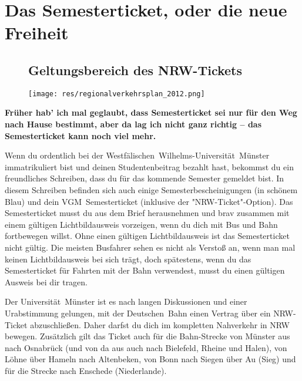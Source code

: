 \section{Das Semesterticket, oder die neue Freiheit}

\begin{center}
\end{center}
\begin{multicols}{2}
\begin{figure*}[t]
\subsection*{Geltungsbereich des NRW-Tickets}
\texttt{[image: res/regionalverkehrsplan\_2012.png]}
\end{figure*}
\textbf{Früher hab' ich mal geglaubt, dass Semesterticket sei nur für den Weg nach Hause bestimmt, aber da lag ich nicht ganz richtig -- das Semesterticket kann noch viel mehr.}


Wenn du ordentlich bei der Westfälischen~Wilhelms-Universität~Münster immatrikuliert bist und deinen Studentenbeitrag bezahlt hast, bekommst du ein freundliches Schreiben, dass du für das kommende Semester gemeldet bist. In diesem Schreiben befinden sich auch einige Semesterbescheinigungen (in schönem Blau) und dein VGM~Semesterticket (inklusive der "NRW-Ticket"-Option). Das Semesterticket musst du aus dem Brief herausnehmen und brav zusammen mit einem gültigen Lichtbildausweis vorzeigen, wenn du dich mit Bus und Bahn fortbewegen willst. Ohne einen gültigen Lichtbildausweis ist das Semesterticket nicht gültig. Die meisten Busfahrer sehen es nicht als Verstoß an, wenn man mal keinen Lichtbildausweis bei sich trägt, doch spätestens, wenn du das Semesterticket für Fahrten mit der Bahn verwendest, musst du einen gültigen Ausweis bei dir tragen.

Der Universität~Münster ist es nach langen Diskussionen und einer Urabstimmung gelungen, mit der Deutschen~Bahn einen Vertrag über ein NRW-Ticket abzuschließen. Daher darfst du dich im kompletten Nahverkehr in NRW bewegen. Zusätzlich gilt das Ticket auch für die Bahn-Strecke von Münster aus nach Osnabrück (und von da aus auch nach Bielefeld, Rheine und Halen), von Löhne über Hameln nach Altenbeken, von Bonn nach Siegen über Au (Sieg) und für die Strecke nach Enschede (Niederlande).


\end{multicols}
